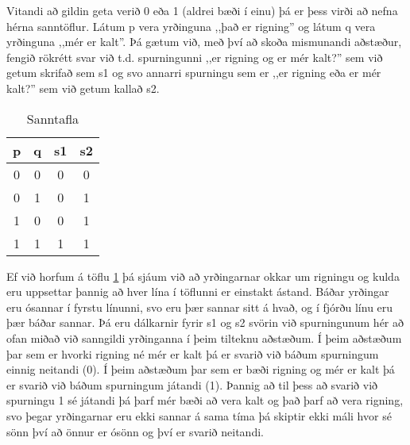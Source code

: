 Vitandi að gildin geta verið 0 eða 1 (aldrei bæði í einu) þá er þess virði að nefna hérna sanntöflur.
Látum p vera yrðinguna ,,það er rigning'' og látum q vera yrðinguna ,,mér er kalt''.
Þá gætum við, með því að skoða mismunandi aðstæður, fengið rökrétt svar við t.d. spurningunni ,,er rigning og er mér kalt?'' sem við getum skrifað sem s1 og svo annarri spurningu sem er ,,er rigning eða er mér kalt?'' sem við getum kallað s2.

\begin{center}
\centering
\begin{table}%
	\centering
\caption{Sanntafla}
\vspace{3pt}
\label{tbl:sanntafla}
\begin{tabular}{|c c|c|c|}
	p & q & s1 & s2\\ 
	\hline  
	0 & 0 & 0 & 0\\
	0 & 1 & 0 & 1\\
	1 & 0 & 0 & 1\\
	1 & 1 & 1 & 1\\
	\end{tabular}

\end{table}
\end{center}
Ef við horfum á töflu \ref{tbl:sanntafla} þá sjáum við að yrðingarnar okkar um rigningu og kulda eru uppsettar þannig að hver lína í töflunni er einstakt ástand.
Báðar yrðingar eru ósannar í fyrstu línunni, svo eru þær sannar sitt á hvað, og í fjórðu línu eru þær báðar sannar.
Þá eru dálkarnir fyrir s1 og s2 svörin við spurningunum hér að ofan miðað við sanngildi yrðinganna í þeim tilteknu aðstæðum.
Í þeim aðstæðum þar sem er hvorki rigning né mér er kalt þá er svarið við báðum spurningum einnig neitandi (0).
Í þeim aðstæðum þar sem er bæði rigning og mér er kalt þá er svarið við báðum spurningum játandi (1).
Þannig að til þess að svarið við spurningu 1 sé játandi þá þarf mér bæði að vera kalt og það þarf að vera rigning, svo þegar yrðingarnar eru ekki sannar á sama tíma þá skiptir ekki máli hvor sé sönn því að önnur er ósönn og því er svarið neitandi.
